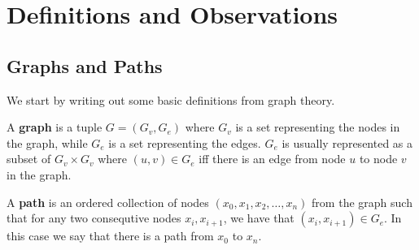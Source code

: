\section{Definitions and Observations}
\label{sec:Definitions and Observations}
\subsection{Graphs and Paths}
\label{sub:Graphs and Paths}
We start by writing out some basic definitions from graph theory.
\begin{definition}
  A \textbf{graph} is a tuple $G = (G_v, G_e)$ where $G_v$ is a set representing the nodes in the graph, while $G_e$ is a set representing the edges.
  $G_e$ is usually represented as a subset of $G_v \times G_v$ where $(u,v) \in G_e$ iff there is an edge from node $u$ to node $v$ in the graph.
\end{definition}
\begin{definition}
  A \textbf{path} is an ordered collection of nodes $(x_0, x_1, x_2, \dots, x_n)$ from the graph such that for any two consequtive nodes $x_i,x_{i+1}$, we have that $(x_i, x_{i+1}) \in G_e$.
  In this case we say that there is a path from $x_0$ to $x_n$.
\end{definition}

